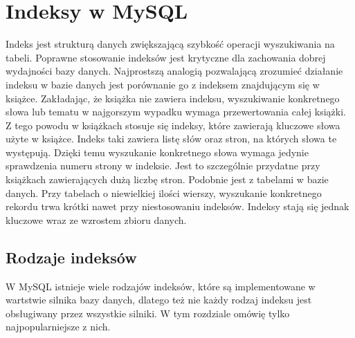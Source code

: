 \section{Indeksy w MySQL}
Indeks jest strukturą danych zwiększającą szybkość operacji wyszukiwania na tabeli. Poprawne stosowanie indeksów jest krytyczne dla zachowania dobrej wydajności bazy danych.
Najprostszą analogią pozwalającą zrozumieć działanie indeksu w bazie danych jest porównanie go z indeksem znajdującym się w książce. Zakładając, że książka nie zawiera indeksu, wyszukiwanie konkretnego słowa lub tematu w najgorszym wypadku wymaga przewertowania całej książki. Z tego powodu w książkach stosuje się indeksy, które zawierają kluczowe słowa użyte w książce. Indeks taki zawiera listę słów oraz stron, na których słowa te występują. Dzięki temu wyszukanie konkretnego słowa wymaga jedynie sprawdzenia numeru strony w indeksie. Jest to szczególnie przydatne przy książkach zawierających dużą liczbę stron. Podobnie jest z tabelami w bazie danych. Przy tabelach o niewielkiej ilości wierszy, wyszukanie konkretnego rekordu trwa krótki nawet przy niestosowaniu indeksów. Indeksy stają się jednak kluczowe wraz ze wzrostem zbioru danych.
\subsection{Rodzaje indeksów}
W MySQL istnieje wiele rodzajów indeksów, które są implementowane w wartstwie silnika bazy danych, dlatego też nie każdy rodzaj indeksu jest obsługiwany przez wszystkie silniki. W tym rozdziale omówię tylko najpopularniejsze z nich.


